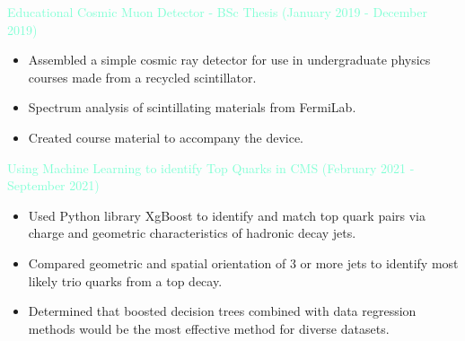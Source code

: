 \documentclass[10pt,a4paper,ragged2e,withhyper]{altacv}
\begin{document}
\begin{paracol}{2}
\textcolor{Aquamarine}{Educational Cosmic Muon Detector - BSc Thesis (January 2019 - December 2019)}
\smallskip
\begin{itemize}
    \item Assembled a simple cosmic ray detector for use in undergraduate physics courses made from a recycled scintillator. 
    \item Spectrum analysis of scintillating materials from FermiLab.
    \item Created course material to accompany the device.
\end{itemize}
\smallskip
\textcolor{Aquamarine}{Using Machine Learning to identify Top Quarks in CMS (February 2021 - September 2021)}
\smallskip
\begin{itemize}
    \item Used Python library XgBoost to identify and match top quark pairs via charge and geometric characteristics of  hadronic decay jets.
    \item Compared geometric and spatial orientation of 3 or more jets to identify most likely trio quarks from a top decay.
    \item Determined that boosted  decision trees combined with data regression methods would be the most effective method for diverse datasets.
\end{itemize}
\smallskip
\switchcolumn




\end{paracol}
\end{document}
